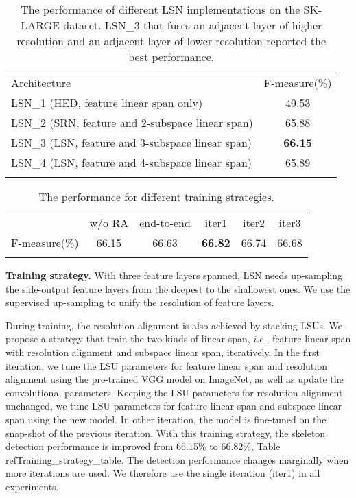 \documentclass[runningheads]{llncs}
\begin{document}
\setlength{\tabcolsep}{20pt}
\begin{table}[t]
\begin{center}
\caption{The performance of different LSN implementations on the SK-LARGE dataset. LSN\_3 that fuses an adjacent layer of higher resolution and an adjacent layer of lower resolution reported the best performance. }
\begin{tabular}{lc}
\hline\noalign{\smallskip}
Architecture & F-measure(\%) \\
\noalign{\smallskip}
\hline
\noalign{\smallskip}
LSN\_1 (HED, feature linear span only)& 49.53 \\
LSN\_2 (SRN, feature and 2-subspace linear span)&65.88 \\
LSN\_3 (LSN, feature and 3-subspace linear span)&\textbf{66.15}\\
LSN\_4 (LSN, feature and 4-subspace linear span)&65.89 \\
\hline
\label{LSU_Table}
\end{tabular}
\end{center}
\end{table}
\setlength{\tabcolsep}{1.4pt}


\setlength{\tabcolsep}{8pt}
\begin{table}[h]
\begin{center}
\caption{The performance for different training strategies.}
\begin{tabular}{lccccc}
\hline\noalign{\smallskip}
   &w/o RA & end-to-end & iter1 & iter2 & iter3 \\
\noalign{\smallskip}
\hline
\noalign{\smallskip}
F-measure(\%)&66.15 & 66.63 & \textbf{66.82} & 66.74 & 66.68 \\
\hline
\label{Training_strategy_table}
\end{tabular}
\end{center}
\end{table}
\setlength{\tabcolsep}{1.4pt}

\textbf{Training strategy.}
With three feature layers spanned, LSN needs up-sampling the side-output feature layers from the deepest to the shallowest ones. We use the supervised up-sampling to unify the resolution of feature layers.

During training, the resolution alignment is also achieved by stacking LSUs.
We propose a strategy that train the two kinds of linear span, $i.e.$, feature linear span with resolution alignment and subspace linear span, iteratively. In the first iteration, we tune the LSU parameters for feature linear span and resolution alignment using the pre-trained VGG model on ImageNet, as well as update the convolutional parameters. Keeping the LSU parameters for resolution alignment unchanged, we tune LSU parameters for feature linear span and subspace linear span using the new model. In other iteration, the model is fine-tuned on the snap-shot of the previous iteration. With this training strategy, the skeleton detection performance is improved from 66.15\% to 66.82\%, Table\\ref{Training_strategy_table}. The detection performance changes marginally when more iterations are used. We therefore use the single iteration (iter1) in all experiments.
\end{document}
